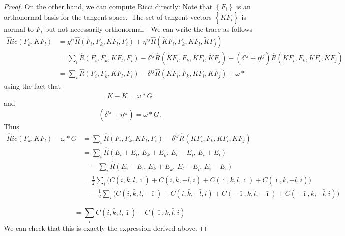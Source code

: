 \documentclass[12pt,letterpaper]{amsart}%
\numberwithin{mycounter}{section}
\theoremstyle{plain}
\numberwithin{equation}{section}
\theoremstyle{definition}
\begin{document}
\begin{proof}
On the other hand, we can compute Ricci directly: Note that $\left\{
F_{i}\right\} $ is an orthonormal basis for the tangent space. $\ $The set
of tangent vectors $\left\{ \tilde{K}F_{i}\right\} $ is normal to $F_{i}$
but not necessarily orthonormal. \ We can write the trace as follows 
\begin{align*}
\hat{R}ic(F_{k},KF_{l})
&= g^{ii}\hat{R}(F_{i},F_{k},KF_{l},F_{i})
  + \eta^{ij}\hat{R}(\tilde{K}F_{i},F_{k},KF_{l},\tilde{K}F_{j}) \\
&= \sum_{i}\hat{R}(F_{i},F_{k},KF_{l},F_{i})
   - \delta^{ij}\hat{R}(\tilde{K}F_{i},F_{k},KF_{l},\tilde{K}F_{j})
   + \left(\delta^{ij}+\eta^{ij}\right)
     \hat{R}(\tilde{K}F_{i},F_{k},KF_{l},\tilde{K}F_{j}) \\
&= \sum_{i}\hat{R}(F_{i},F_{k},KF_{l},F_{i})
   - \delta^{ij}\hat{R}(KF_{i},F_{k},KF_{l},KF_{j})
   + \omega \ast
\end{align*}
using the fact that 
\begin{equation*}
K-\tilde{K}=\omega \ast G
\end{equation*}
and 
\begin{equation*}
\left( \delta^{ij}+\eta^{ij}\right) = \omega{\ast}G.
\end{equation*}
Thus
\begin{align*}
\hat{R}ic(F_{k},KF_{l}) - \omega \ast G
&= \sum_{i}\hat{R}(F_{i},F_{k},KF_{l},F_{i})
   - \delta^{ij}\hat{R}(KF_{i},F_{k},KF_{l},KF_{j})
\\
&= \sum_{i}\hat{R}(E_{i}+E_{\bar{\imath}},\,E_{k}+E_{\bar{k}},\,E_{l}-E_{\bar{l}},\,E_{i}+E_{\bar{\imath}}) \\
&\quad - \sum_{i}\hat{R}(E_{i}-E_{\bar{\imath}},\,E_{k}+E_{\bar{k}},\,E_{l}-E_{\bar{l}},\,E_{i}-E_{\bar{\imath}})
\\
&= \frac{1}{2}\sum_{i}\Big(
    C(i,\bar{k},l,\bar{\imath})
  + C(i,\bar{k},-\bar{l},i)
  + C(\bar{\imath},k,l,\bar{\imath})
  + C(\bar{\imath},k,-\bar{l},i)
  \Big) \\
&\quad - \frac{1}{2}\sum_{i}\Big(
    C(i,\bar{k},l,-\bar{\imath})
  + C(i,\bar{k},-\bar{l},i)
  + C(-\bar{\imath},k,l,-\bar{\imath})
  + C(-\bar{\imath},k,-\bar{l},i)
  \Big)
\end{align*}

\begin{equation*}
= \sum_{i} C(i,\bar{k},l,\bar{\imath}) - C(\bar{\imath},k,\bar{l},i)
\end{equation*}
We can check that this is exactly the expression derived above. 
\end{proof}
\end{document}
